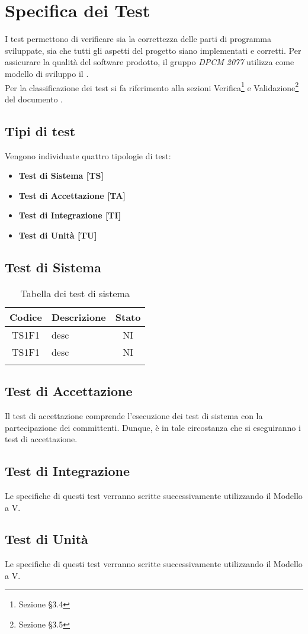 
\section{Specifica dei Test}
I test permettono di verificare sia la correttezza delle parti di programma sviluppate, sia che tutti gli aspetti del progetto siano implementati e corretti.
Per assicurare la qualità del software prodotto, il gruppo \textit{DPCM 2077} utilizza come modello di sviluppo il .
\\
Per la classificazione dei test si fa riferimento alla sezioni Verifica\footnote{Sezione §3.4} e Validazione\footnote{Sezione §3.5} del documento .
	\subsection{Tipi di test}
	Vengono individuate quattro tipologie di test:
	\begin{itemize}
		\item \textbf{Test di Sistema [TS]}
		\item \textbf{Test di Accettazione [TA]}
		\item \textbf{Test di Integrazione [TI]}
		\item \textbf{Test di Unità [TU]}
	\end{itemize}
	\subsection{Test di Sistema}
	\begin{center}
		\begin{longtable}{|c|C{10cm}|c|}
			\hline
			\textbf{Codice} & \textbf{Descrizione} & \textbf{Stato}  \\ 
						
			\hline
			\endhead
			
			\hline
			TS1F1 & desc & NI \\
			\hline
			TS1F1 & desc & NI \\			
			\hline
			\hiderowcolors
			\caption{Tabella dei test di sistema}		
		\end{longtable}	
	\end{center}

	\subsection{Test di Accettazione}
	Il test di accettazione comprende l'esecuzione dei test di sistema con la partecipazione dei committenti. Dunque, è in tale circostanza che si eseguiranno i test di accettazione. 
	\subsection{Test di Integrazione}
	Le specifiche di questi test verranno scritte successivamente utilizzando il Modello a V.
	\subsection{Test di Unità}
	Le specifiche di questi test verranno scritte successivamente utilizzando il Modello a V.